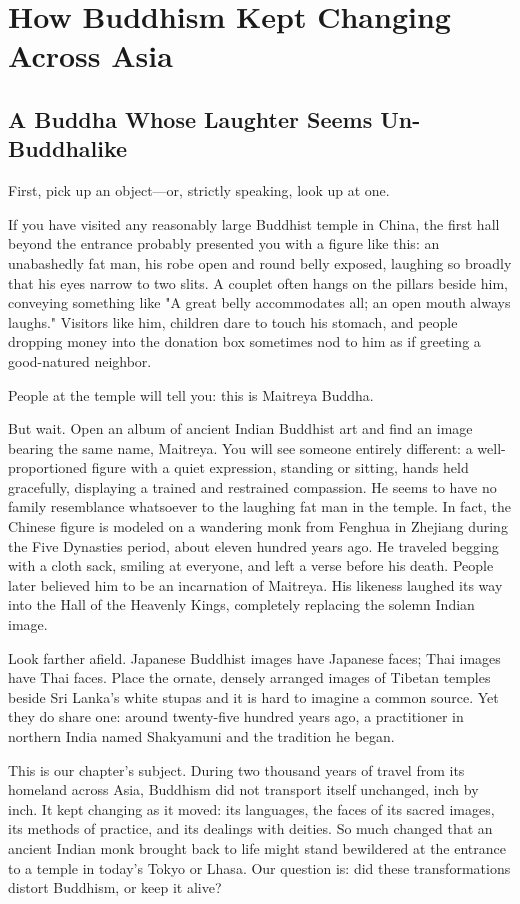\chapter[Buddhism Changes Across Asia]{How Buddhism Kept Changing Across Asia}
\section{A Buddha Whose Laughter Seems Un-Buddhalike}
First, pick up an object---or, strictly speaking, look up at one.

If you have visited any reasonably large Buddhist temple in China, the first hall beyond the entrance probably presented you with a figure like this: an unabashedly fat man, his robe open and round belly exposed, laughing so broadly that his eyes narrow to two slits. A couplet often hangs on the pillars beside him, conveying something like "A great belly accommodates all; an open mouth always laughs." Visitors like him, children dare to touch his stomach, and people dropping money into the donation box sometimes nod to him as if greeting a good-natured neighbor.

People at the temple will tell you: this is Maitreya Buddha.

But wait. Open an album of ancient Indian Buddhist art and find an image bearing the same name, Maitreya. You will see someone entirely different: a well-proportioned figure with a quiet expression, standing or sitting, hands held gracefully, displaying a trained and restrained compassion. He seems to have no family resemblance whatsoever to the laughing fat man in the temple. In fact, the Chinese figure is modeled on a wandering monk from Fenghua in Zhejiang during the Five Dynasties period, about eleven hundred years ago. He traveled begging with a cloth sack, smiling at everyone, and left a verse before his death. People later believed him to be an incarnation of Maitreya. His likeness laughed its way into the Hall of the Heavenly Kings, completely replacing the solemn Indian image.

Look farther afield. Japanese Buddhist images have Japanese faces; Thai images have Thai faces. Place the ornate, densely arranged images of Tibetan temples beside Sri Lanka's white stupas and it is hard to imagine a common source. Yet they do share one: around twenty-five hundred years ago, a practitioner in northern India named Shakyamuni and the tradition he began.

This is our chapter's subject. During two thousand years of travel from its homeland across Asia, Buddhism did not transport itself unchanged, inch by inch. It kept changing as it moved: its languages, the faces of its sacred images, its methods of practice, and its dealings with deities. So much changed that an ancient Indian monk brought back to life might stand bewildered at the entrance to a temple in today's Tokyo or Lhasa. Our question is: did these transformations distort Buddhism, or keep it alive?

